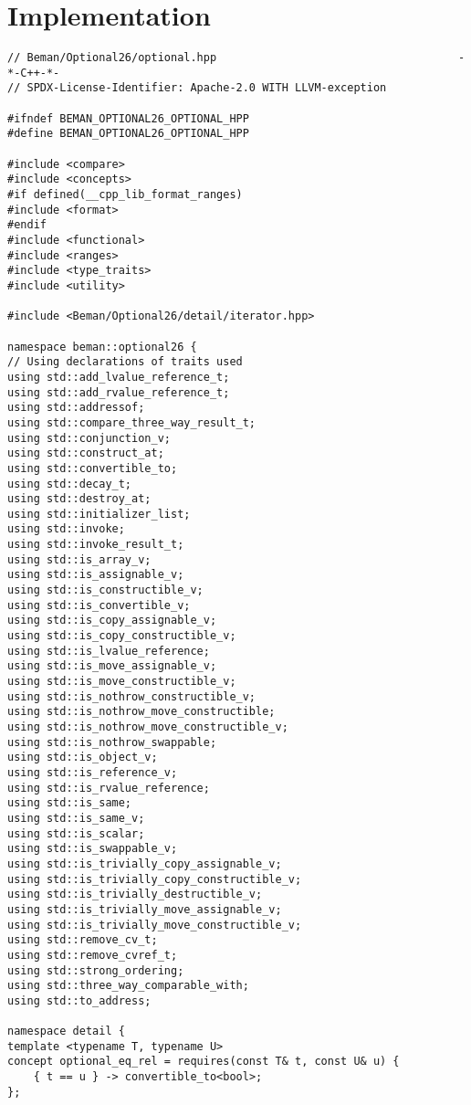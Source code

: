 \documentclass[a4paper,10pt,oneside,openany,final,article]{memoir}
\begin{document}
\renewcommand{\bibname}{References}




\backmatter
\chapter*{Implementation}

\begin{verbatim}
// Beman/Optional26/optional.hpp                                     -*-C++-*-
// SPDX-License-Identifier: Apache-2.0 WITH LLVM-exception

#ifndef BEMAN_OPTIONAL26_OPTIONAL_HPP
#define BEMAN_OPTIONAL26_OPTIONAL_HPP

#include <compare>
#include <concepts>
#if defined(__cpp_lib_format_ranges)
#include <format>
#endif
#include <functional>
#include <ranges>
#include <type_traits>
#include <utility>

#include <Beman/Optional26/detail/iterator.hpp>

namespace beman::optional26 {
// Using declarations of traits used
using std::add_lvalue_reference_t;
using std::add_rvalue_reference_t;
using std::addressof;
using std::compare_three_way_result_t;
using std::conjunction_v;
using std::construct_at;
using std::convertible_to;
using std::decay_t;
using std::destroy_at;
using std::initializer_list;
using std::invoke;
using std::invoke_result_t;
using std::is_array_v;
using std::is_assignable_v;
using std::is_constructible_v;
using std::is_convertible_v;
using std::is_copy_assignable_v;
using std::is_copy_constructible_v;
using std::is_lvalue_reference;
using std::is_move_assignable_v;
using std::is_move_constructible_v;
using std::is_nothrow_constructible_v;
using std::is_nothrow_move_constructible;
using std::is_nothrow_move_constructible_v;
using std::is_nothrow_swappable;
using std::is_object_v;
using std::is_reference_v;
using std::is_rvalue_reference;
using std::is_same;
using std::is_same_v;
using std::is_scalar;
using std::is_swappable_v;
using std::is_trivially_copy_assignable_v;
using std::is_trivially_copy_constructible_v;
using std::is_trivially_destructible_v;
using std::is_trivially_move_assignable_v;
using std::is_trivially_move_constructible_v;
using std::remove_cv_t;
using std::remove_cvref_t;
using std::strong_ordering;
using std::three_way_comparable_with;
using std::to_address;

namespace detail {
template <typename T, typename U>
concept optional_eq_rel = requires(const T& t, const U& u) {
    { t == u } -> convertible_to<bool>;
};


\end{verbatim}
\end{document}
